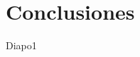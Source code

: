 \documentclass[xcolor=svgnames]{beamer}
\begin{document}




\section{Conclusiones}

\begin{frame}{}
	\tableofcontents[currentsection]
\end{frame}

\begin{frame}{Diapo1}
	
\end{frame}
\end{document}
